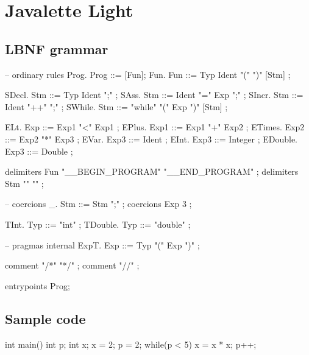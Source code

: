 \documentclass[a4paper,12pt,twosided]{report}
\begin{document}
%
%




%
%

\appendix
\chapter{Javalette Light}

\section{LBNF grammar}
\begin{code}
-- ordinary rules
Prog.     Prog     ::= [Fun];
Fun.      Fun      ::= Typ Ident "(" ")"  [Stm] ;

SDecl.    Stm      ::= Typ Ident ";"  ;
SAss.     Stm      ::= Ident "=" Exp ";"  ;
SIncr.    Stm      ::= Ident "++" ";"  ;
SWhile.   Stm      ::= "while" "(" Exp ")" [Stm]  ;

ELt.      Exp      ::= Exp1 "<" Exp1 ;
EPlus.    Exp1     ::= Exp1 "+" Exp2 ;
ETimes.   Exp2     ::= Exp2 "*" Exp3 ;
EVar.     Exp3     ::= Ident ;
EInt.     Exp3     ::= Integer ;
EDouble.  Exp3     ::= Double ;

delimiters Fun "__BEGIN_PROGRAM" "__END_PROGRAM" ;
delimiters Stm "{" "}" ;

-- coercions
_.        Stm      ::= Stm ";" ;
coercions Exp 3 ;

TInt.     Typ  ::= "int" ;
TDouble.  Typ  ::= "double" ;

-- pragmas
internal ExpT. Exp ::= Typ "(" Exp ")" ;

comment "/*" "*/" ;
comment "//" ;

entrypoints Prog;
\end{code}

\newpage
\section{Sample code}
\begin{code}
int main() {
    int p;
    int x;
    x = 2;
    p = 2;
    while(p < 5) {
        x = x * x;
        p++;
    }
}
\end{code}
\end{document}
